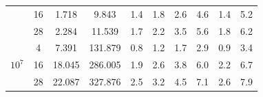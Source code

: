 \documentclass[times, utf8, seminar, numeric]{fer}
\begin{document}
\begin{table}[h]
\begin{tabular}{c|c|c|c|c|c|c|c|c|c}
      & \num{16} & \num{1.718} & \num{9.843} & \num{1.4} & \num{1.8} & \num{2.6} & \num{4.6} & \num{1.4} & \num{5.2} \\
      & \num{28} & \num{2.284} & \num{11.539} & \num{1.7} & \num{2.2} & \num{3.5} & \num{5.6} & \num{1.8} & \num{6.2} \\
    \hline
    \multirow{3}{*}{$10^7$}
      & \num{4} & \num{7.391} & \num{131.879} & \num{0.8} & \num{1.2} & \num{1.7} & \num{2.9} & \num{0.9} & \num{3.4} \\
      & \num{16} & \num{18.045} & \num{286.005} & \num{1.9} & \num{2.6} & \num{3.8} & \num{6.0} & \num{2.2} & \num{6.7} \\
      & \num{28} & \num{22.087} & \num{327.876} & \num{2.5} & \num{3.2} & \num{4.5} & \num{7.1} & \num{2.6} & \num{7.9} \\
  \end{tabular}
\end{table}
\end{document}
